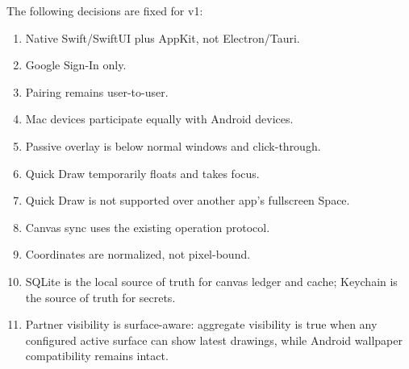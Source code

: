 \documentclass[11pt]{article}
\begin{document}
The following decisions are fixed for v1:
\begin{enumerate}
  \item Native Swift/SwiftUI plus AppKit, not Electron/Tauri.
  \item Google Sign-In only.
  \item Pairing remains user-to-user.
  \item Mac devices participate equally with Android devices.
  \item Passive overlay is below normal windows and click-through.
  \item Quick Draw temporarily floats and takes focus.
  \item Quick Draw is not supported over another app's fullscreen Space.
  \item Canvas sync uses the existing operation protocol.
  \item Coordinates are normalized, not pixel-bound.
  \item SQLite is the local source of truth for canvas ledger and cache; Keychain is the source of truth for secrets.
  \item Partner visibility is surface-aware: aggregate visibility is true when any configured active surface can show latest drawings, while Android wallpaper compatibility remains intact.
\end{enumerate}
\end{document}
